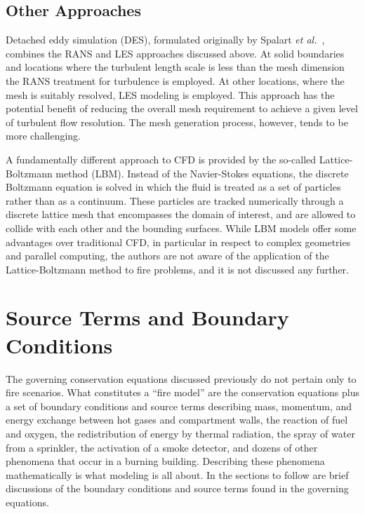 \documentclass[graybox]{svmult}
\begin{document}
\subsection{Other Approaches}

Detached eddy simulation (DES), formulated originally by Spalart {\em et al.}~\cite{Spalart}, combines the RANS and LES approaches discussed above. At solid boundaries and locations where the turbulent length scale is less than the mesh dimension the RANS treatment for turbulence is employed. At other locations, where the mesh is suitably resolved, LES modeling is employed. This approach has the potential benefit of reducing the overall mesh requirement to achieve a given level of turbulent flow resolution. The mesh generation process, however, tends to be more challenging.

A fundamentally different approach to CFD is provided by the so-called Lattice-Boltzmann method (LBM). Instead of the Navier-Stokes equations, the discrete Boltzmann equation is solved in which the fluid is treated as a set of particles rather than as a continuum. These particles are tracked numerically through a discrete lattice mesh that encompasses the domain of interest, and are allowed to collide with each other and the bounding surfaces. While LBM models offer some advantages over traditional CFD, in particular in respect to complex geometries and parallel computing, the authors are not aware of the application of the Lattice-Boltzmann method to fire problems, and it is not discussed any further.



\section{Source Terms and Boundary Conditions}

The governing conservation equations discussed previously do not pertain only to fire scenarios. What constitutes a ``fire model'' are the conservation equations plus a set of boundary conditions and source terms describing mass, momentum, and energy exchange between hot gases and compartment walls, the reaction of fuel and oxygen, the redistribution of energy by thermal radiation, the spray of water from a sprinkler, the activation of a smoke detector, and dozens of other phenomena that occur in a burning building. Describing these phenomena mathematically is what modeling is all about. In the sections to follow are brief discussions of the boundary conditions and source terms found in the governing equations.
\end{document}
